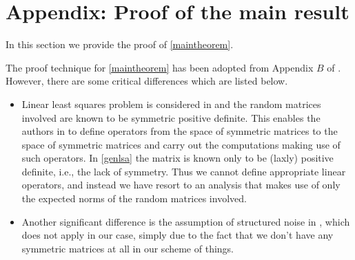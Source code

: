 \onecolumn
\section{Appendix: Proof of the main result}

In this section we provide the proof of \cref{maintheorem}.

The proof technique for \cref{maintheorem} has been adopted from Appendix $B$ of \cite{bachharder} . However, there are some critical differences which are listed below.
\begin{itemize}
\item Linear least squares problem is considered in \cite{bachharder} and the random matrices involved are known to be symmetric positive definite. This enables the authors in \cite{bachharder} to define operators from the space of symmetric matrices to the space of symmetric matrices and carry out the computations making use of such operators. In \cref{genlsa} the matrix is known only to be (laxly) positive definite, i.e., the lack of symmetry. 
Thus we cannot define appropriate linear operators, and instead we have resort to an analysis that makes use of only the expected norms of the random matrices involved.
\item Another significant difference is the assumption of structured noise in \cite{bachharder}, which does not apply in our case, simply due to the fact that we don't have any symmetric matrices at all in our scheme of things.
\end{itemize}



